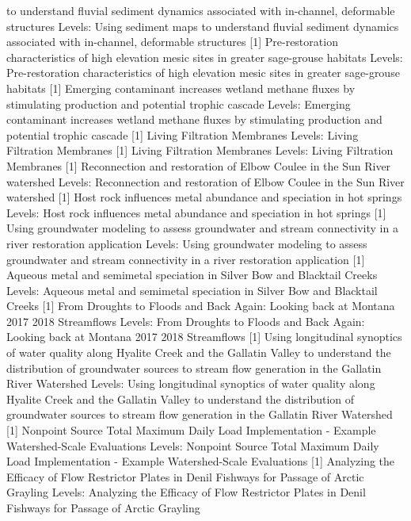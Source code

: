 \documentclass[]{article}
\begin{document}
to understand fluvial sediment dynamics associated with in-channel,
deformable structures Levels: Using sediment maps to understand fluvial
sediment dynamics associated with in-channel, deformable structures
{[}1{]} Pre-restoration characteristics of high elevation mesic sites in
greater sage-grouse habitats Levels: Pre-restoration characteristics of
high elevation mesic sites in greater sage-grouse habitats {[}1{]}
Emerging contaminant increases wetland methane fluxes by stimulating
production and potential trophic cascade Levels: Emerging contaminant
increases wetland methane fluxes by stimulating production and potential
trophic cascade {[}1{]} Living Filtration Membranes Levels: Living
Filtration Membranes {[}1{]} Living Filtration Membranes Levels: Living
Filtration Membranes {[}1{]} Reconnection and restoration of Elbow
Coulee in the Sun River watershed Levels: Reconnection and restoration
of Elbow Coulee in the Sun River watershed {[}1{]} Host rock influences
metal abundance and speciation in hot springs Levels: Host rock
influences metal abundance and speciation in hot springs {[}1{]} Using
groundwater modeling to assess groundwater and stream connectivity in a
river restoration application Levels: Using groundwater modeling to
assess groundwater and stream connectivity in a river restoration
application {[}1{]} Aqueous metal and semimetal speciation in Silver Bow
and Blacktail Creeks Levels: Aqueous metal and semimetal speciation in
Silver Bow and Blacktail Creeks {[}1{]} From Droughts to Floods and Back
Again: Looking back at Montana 2017 \xdb{} 2018 Streamflows
Levels: From Droughts to Floods and Back Again: Looking back at Montana
2017 \xdb{} 2018 Streamflows {[}1{]} Using longitudinal synoptics
of water quality along Hyalite Creek and the Gallatin Valley to
understand the distribution of groundwater sources to stream flow
generation in the Gallatin River Watershed Levels: Using longitudinal
synoptics of water quality along Hyalite Creek and the Gallatin Valley
to understand the distribution of groundwater sources to stream flow
generation in the Gallatin River Watershed {[}1{]} Nonpoint Source Total
Maximum Daily Load Implementation - Example Watershed-Scale Evaluations
Levels: Nonpoint Source Total Maximum Daily Load Implementation -
Example Watershed-Scale Evaluations {[}1{]} Analyzing the Efficacy of
Flow Restrictor Plates in Denil Fishways for Passage of Arctic Grayling
Levels: Analyzing the Efficacy of Flow Restrictor Plates in Denil
Fishways for Passage of Arctic Grayling
\end{document}
